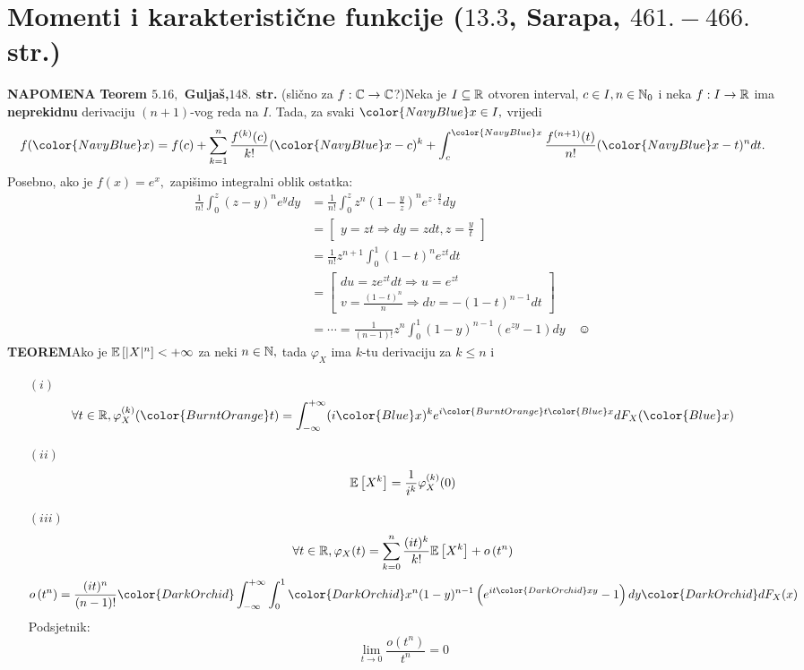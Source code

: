 \documentclass{article}
\begin{document}
\section{Momenti i karakteristične funkcije (\textsection \(13.3\), Sarapa, \(461.-466.\) str.)}
\textbf{NAPOMENA}\newline\textbf{ Teorem \(5.16,\) Guljaš,\(148.\) str. }(slično za \(f:\Bbb C\to\Bbb C\)?)\newline Neka je \(I\subseteq\Bbb R\) otvoren interval, \(c\in I,n\in\Bbb N_0\) i neka \(f:I\to\Bbb R\) ima \textbf{neprekidnu} derivaciju \((n+1)\)-vog reda na \(I.\) Tada, za svaki \({\color{NavyBlue}x\in I},\) vrijedi \[f({\color{NavyBlue}x})=f(c)+\sum_{k=1}^n\frac{f^{(k)}(c)}{k!}({\color{NavyBlue}x}-c)^k+\int_c^{{\color{NavyBlue}x}}\frac{f^{(n+1)}(t)}{n!}({\color{NavyBlue}x}-t)^ndt.\] Posebno, ako je \(f(x)=e^x,\) zapišimo integralni oblik ostatka: 
\[\begin{aligned}\frac1{n!}\int_0^z(z-y)^ne^ydy&=\frac1{n!}\int_0^zz^n\left(1-\frac{y}z\right)^ne^{z\cdot\frac{y}z}dy\\&=\begin{bmatrix}y=zt\Rightarrow dy=zdt,z=\frac{y}t\end{bmatrix}\\&=\frac1{n!}z^{n+1}\int_0^1(1-t)^ne^{zt}dt\\&=\begin{bmatrix}du=ze^{zt}dt\Rightarrow u=e^{zt}\\v=\frac{(1-t)^n}n\Rightarrow dv=-(1-t)^{n-1}dt\end{bmatrix}\\&=\cdots=\frac1{(n-1)!}z^n\int_0^1(1-y)^{n-1}\left(e^{zy}-1\right)dy\quad\smiley\end{aligned}\]
\textbf{TEOREM}\newline Ako je \(\Bbb E\left[|X|^n\right]<+\infty\) za neki \(n\in\Bbb N,\) tada \(\varphi_X\) ima \(k\)-tu derivaciju za \(k\le n\) i
\begin{enumerate}
    \item[\((i)\)] \[\forall t\in\Bbb R,\varphi_X^{(k)}({\color{BurntOrange}t})=\int_{-\infty}^{+\infty}(i{\color{Blue}x})^ke^{i{\color{BurntOrange}t}{\color{Blue}x}}dF_X({\color{Blue}x})\] 
    \item[\((ii)\)] \[\Bbb E\left[X^k\right]=\frac1{i^k}\varphi_X^{(k)}(0)\]
    \item[\((iii)\)] \[\forall t\in\Bbb R,\varphi_X(t)=\sum_{k=0}^n\frac{(it)^k}{k!}\Bbb E\left[X^k\right]+ o\left(t^n\right)\] \[o\left(t^n\right)=\frac{(it)^n}{(n-1)!}{\color{DarkOrchid}\int_{-\infty}^{+\infty}}\int_0^1{\color{DarkOrchid}x^n}(1-y)^{n-1}\left(e^{it{\color{DarkOrchid}x}y}-1\right)dy{\color{DarkOrchid}dF_X(x)}\] Podsjetnik: \[\lim_{t\to 0}\frac{o\left(t^n\right)}{t^n}=0\]
\end{enumerate}
\end{document}
